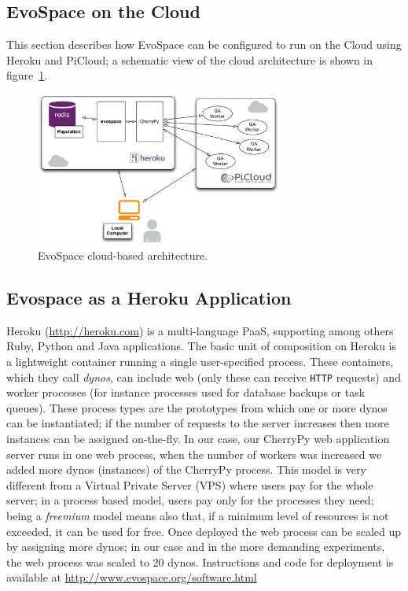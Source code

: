
\subsection{EvoSpace on the Cloud}
This section describes how EvoSpace can be configured to run on the Cloud using Heroku and PiCloud; a schematic view of the cloud architecture is shown in figure~\ref{herokuPiCloud}.

\begin{figure}[t]
\centering
\includegraphics[width=3.2in]{herokuPiCloud.eps}
\caption{EvoSpace cloud-based architecture.}
\label{herokuPiCloud}
\end{figure}


\subsection{Evospace as a Heroku Application}

Heroku (\url{http://heroku.com}) is a multi-language PaaS, supporting among others Ruby, Python and Java applications. The basic unit of composition on
Heroku is a lightweight container running a single user-specified
process. These containers, which they call {\em dynos}, can include web
(only these can receive {\tt HTTP} requests) and worker processes
(for instance processes used for database backups or task queues).
These  process types are the prototypes from which one or more dynos 
can be instantiated; if the number of requests to the server increases then 
more instances can be assigned on-the-fly. In our case, our CherryPy 
web application server runs in one web process, when the number 
of workers was increased we added more dynos (instances) of the 
CherryPy process. This model is very different from a Virtual Private Server (VPS) where users pay for the whole server; in a process based model, users pay only for the processes they need; being a {\em freemium} model means also that, if a minimum level of resources is not exceeded, it can be used for
free. 
Once deployed the web process can be scaled up by assigning more dynos;
in our case and in the more demanding experiments, the web process was scaled to 20 dynos. Instructions and code for deployment is available at \url{http://www.evospace.org/software.html} 


